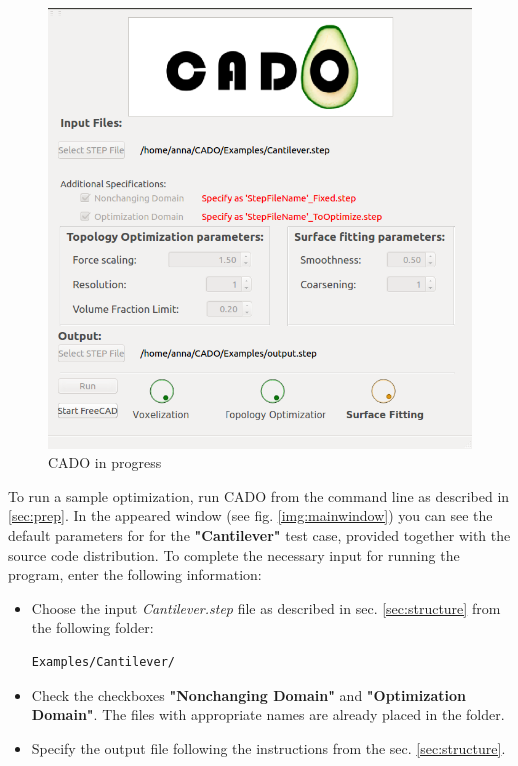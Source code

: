 \documentclass[
12pt, %
a4paper, %
oneside, %
headinclude,footinclude, %
BCOR5mm, %
]{scrartcl}
\begin{document}
\begin{figure}
\centering
\includegraphics[scale=0.4]{Pictures/CADO_inProgress}
\caption{CADO in progress}
\label{fig:inProgress}
\end{figure}
To run a sample optimization, run CADO from the command line as described in \ref{sec:prep}. In the appeared window (see fig. \ref{img:mainwindow}) you can see the default parameters for for the \textbf{"Cantilever"} test case, provided together with the source code distribution. To complete the necessary input for running the program, enter the following information:
\begin{itemize}
\item Choose the input \textit{Cantilever.step} file as described in sec. \ref{sec:structure} from the following folder:
\begin{lstlisting}[language = {Promela}]
Examples/Cantilever/
\end{lstlisting}
\item Check the checkboxes \textbf{"Nonchanging Domain"} and \textbf{"Optimization Domain"}. The files with appropriate names are already placed in the folder.
\item Specify the output file following the instructions from the sec. \ref{sec:structure}.
\end{itemize}
\end{document}
